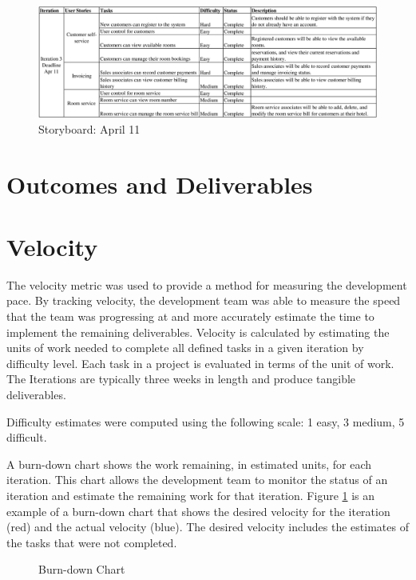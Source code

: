 \documentclass[12pt]{elsarticle}
\begin{document}
\begin{figure}[!ht]
	\centering
	\includegraphics[scale=0.18]{images/storyboard_apr11}
	\caption{Storyboard: April 11}
\end{figure}

\section{Outcomes and Deliverables}

\clearpage


\section{Velocity}

The velocity metric was used to provide a method for measuring the development pace. By tracking velocity, the development team was able to measure the speed that the team was progressing at and more accurately estimate the time to implement the remaining deliverables. Velocity is calculated by estimating the units of work needed to complete all defined tasks in a given iteration by difficulty level. Each task in a project is evaluated in terms of the unit of work. The Iterations are typically three weeks in length and produce tangible deliverables.

Difficulty estimates were computed using the following scale: 1 easy, 3 medium, 5 difficult.

A burn-down chart shows the work remaining, in estimated units, for each iteration. This chart allows the development team to monitor the status of an iteration and estimate the remaining work for that iteration. Figure \ref{burndown} is an example of a burn-down chart that shows the desired velocity for the iteration (red) and the actual velocity (blue). The desired velocity includes the estimates of the tasks that were not completed.

\begin{figure}[!ht]
	\centering
\caption{Burn-down Chart}
\label{burndown}
\end{figure}
\end{document}
